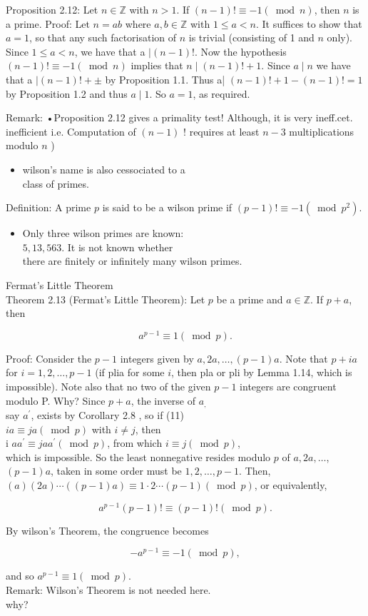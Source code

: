 \documentclass[10pt]{article}
\begin{document}
Proposition 2.12: Let $n \in \mathbb{Z}$ with $n>1$. If $(n-1)!\equiv-1(\bmod n)$, then $n$ is a prime. Proof: Let $n=a b$ where $a, b \in \mathbb{Z}$ with $1 \leqslant a<n$. It suffices to show that $a=1$, so that any such factorisation of $n$ is trivial (consisting of 1 and $n$ only). Since $1 \leqslant a<n$, we have that a $\mid(n-1)!$. Now the hypothesis $(n-1)!\equiv-1(\bmod n)$ implies that $n \mid(n-1)!+1$. Since $a \mid n$ we have that a $\mid(n-1)!+ \pm$ by Proposition 1.1. Thus a| $(n-1)!+1-(n-1)!=1$ by Proposition 1.2 and thus $a \mid 1$. So $a=1$, as required.

Remark: •Proposition 2.12 gives a primality test! Although, it is very ineff.cet. inefficient i.e. Computation of $(n-1)$ ! requires at least $n-3$ multiplications modulo $n$ )

\begin{itemize}
  \item wilson's name is also cessociated to a\\
class of primes.
\end{itemize}

Definition: A prime $p$ is said to be a wilson prime if $(p-1)!\equiv-1\left(\bmod p^{2}\right)$.

\begin{itemize}
  \item Only three wilson primes are known:\\
$5,13,563$. It is not known whether\\
there are finitely or infinitely many wilson primes.
\end{itemize}

Fermat's Little Theorem\\
Theorem 2.13 (Fermat's Little Theorem): Let $p$ be a prime and $a \in \mathbb{Z}$. If $p+a$, then

$$
a^{p-1} \equiv 1(\bmod p) .
$$

Proof: Consider the $p-1$ integers given by $a, 2 a, \ldots,(p-1) a$. Note that $p+i a$ for $i=1,2, \ldots, p-1$ (if plia for some $i$, then pla or pli by Lemma 1.14, which is impossible). Note also that no two of the given $p-1$ integers are congruent modulo P. Why? Since $p+a$, the inverse of $a_{\text {, }}$\\
say $a^{\prime}$, exists by Corollary 2.8 , so if (11)\\
$i a \equiv j a(\bmod p)$ with $i \neq j$, then\\
i $a a^{\prime} \equiv j a a^{\prime}(\bmod p)$, from which $i \equiv j(\bmod p)$,\\
which is impossible. So the least nonnegative resides modulo $p$ of $a, 2 a, \ldots$,\\
$(p-1) a$, taken in some order must be $1,2, \ldots, p-1$. Then,\\
$(a)(2 a) \cdots((p-1) a) \equiv 1 \cdot 2 \cdots(p-1)(\bmod p)$, or equivalently,

$$
a^{p-1}(p-1)!\equiv(p-1)!(\bmod p) .
$$

By wilson's Theorem, the congruence becomes

$$
-a^{p-1} \equiv-1(\bmod p),
$$

and so $a^{p-1} \equiv 1(\bmod p)$.\\
Remark: Wilson's Theorem is not needed here.\\
why?
\end{document}
